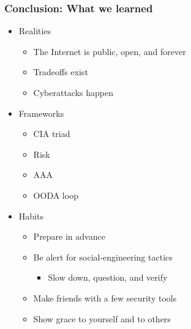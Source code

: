 \documentclass[blue]{beamer}
\begin{document}
\begin{frame}
\frametitle{Conclusion: What we learned}

\begin{itemize}
  \item Realities
  \begin{itemize}
    \item The Internet is public, open, and forever
    \item Tradeoffs exist
    \item Cyberattacks happen
  \end{itemize}
  \item Frameworks
  \begin{itemize}
    \item CIA triad
    \item Risk
    \item AAA
    \item OODA loop
  \end{itemize}
  \item Habits
  \begin{itemize}
    \item Prepare in advance
    \item Be alert for social-engineering tactics
    \begin{itemize}
      \item Slow down, question, and verify
    \end{itemize}
    \item Make friends with a few security tools
    \item Show grace to yourself and to others
  \end{itemize}
\end{itemize}

\end{frame}
\end{document}
